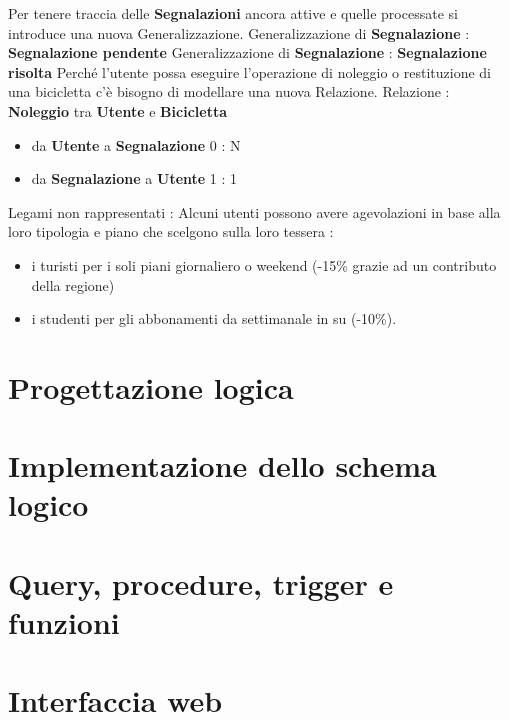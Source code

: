 \documentclass[a4paper,twoside]{article}
\begin{document}
Per tenere traccia delle \textbf{Segnalazioni} ancora attive e quelle processate si introduce una nuova Generalizzazione.\newline
Generalizzazione di \textbf{Segnalazione} : \textbf{Segnalazione pendente}\newline
Generalizzazione di \textbf{Segnalazione} : \textbf{Segnalazione risolta}\newline
Perché l'utente possa eseguire l'operazione di noleggio o restituzione di una bicicletta c'è bisogno di modellare una nuova Relazione.\newline
Relazione : \textbf{Noleggio} tra \textbf{Utente} e \textbf{Bicicletta}
\begin{itemize}
 \item da \textbf{Utente} a \textbf{Segnalazione} 0 : N
 \item da \textbf{Segnalazione} a \textbf{Utente} 1 : 1
\end{itemize}




%
%
Legami non rappresentati :\newline
Alcuni utenti possono avere agevolazioni in base alla loro tipologia e piano che scelgono sulla loro tessera :
\begin{itemize}
 \item  i turisti per i soli piani giornaliero o weekend (-15\% grazie ad un contributo della regione)
 \item i studenti per gli abbonamenti da settimanale in su (-10\%).
\end{itemize}

\section{Progettazione logica}

\section{Implementazione dello schema logico}

\section{Query, procedure, trigger e funzioni}

\section{Interfaccia web}
\end{document}
